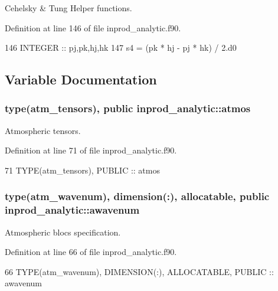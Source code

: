 Cehelsky \& Tung Helper functions. 



Definition at line 146 of file inprod\+\_\+analytic.\+f90.


\begin{DoxyCode}
146     \textcolor{keywordtype}{INTEGER} :: pj,pk,hj,hk
147     s4 = (pk * hj - pj * hk) / 2.d0
\end{DoxyCode}


\subsection{Variable Documentation}
\subsubsection[{\texorpdfstring{atmos}{atmos}}]{\setlength{\rightskip}{0pt plus 5cm}type({\bf atm\+\_\+tensors}), public inprod\+\_\+analytic\+::atmos}\hypertarget{namespaceinprod__analytic_a6f4fe9aa292d78b871e5498e411d1297}{}\label{namespaceinprod__analytic_a6f4fe9aa292d78b871e5498e411d1297}


Atmospheric tensors. 



Definition at line 71 of file inprod\+\_\+analytic.\+f90.


\begin{DoxyCode}
71   \textcolor{keywordtype}{TYPE}(atm\_tensors), \textcolor{keywordtype}{PUBLIC} :: atmos 
\end{DoxyCode}
\subsubsection[{\texorpdfstring{awavenum}{awavenum}}]{\setlength{\rightskip}{0pt plus 5cm}type({\bf atm\+\_\+wavenum}), dimension(\+:), allocatable, public inprod\+\_\+analytic\+::awavenum}\hypertarget{namespaceinprod__analytic_aa6b6ebedac44495720ffe649bc937a56}{}\label{namespaceinprod__analytic_aa6b6ebedac44495720ffe649bc937a56}


Atmospheric blocs specification. 



Definition at line 66 of file inprod\+\_\+analytic.\+f90.


\begin{DoxyCode}
66   \textcolor{keywordtype}{TYPE}(atm\_wavenum), \textcolor{keywordtype}{DIMENSION(:)}, \textcolor{keywordtype}{ALLOCATABLE}, \textcolor{keywordtype}{PUBLIC} :: awavenum 
\end{DoxyCode}
